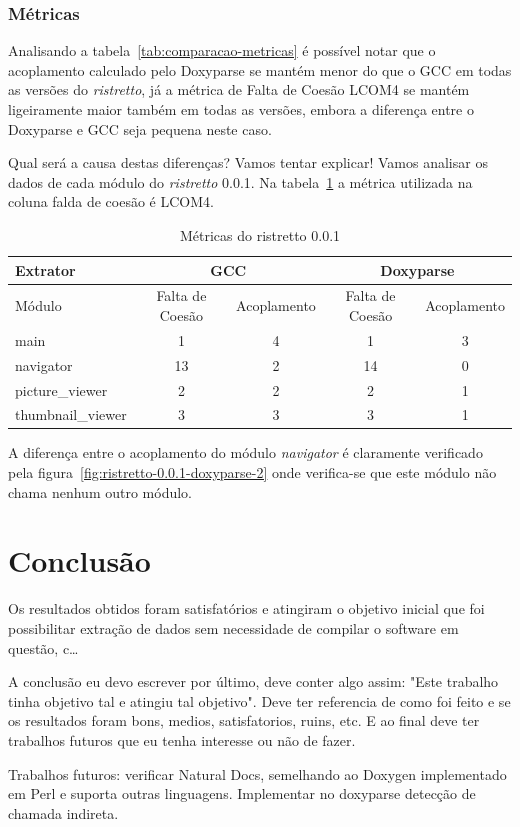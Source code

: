 \subsection{Métricas}

Analisando a tabela~\ref{tab:comparacao-metricas}  é possível notar que o acoplamento calculado pelo Doxyparse
se mantém menor do que o GCC em todas as versões do {\it ristretto}, já a métrica de
Falta de Coesão LCOM4 se mantém ligeiramente maior também em todas as versões,
embora a diferença entre o Doxyparse e GCC seja pequena neste caso.

Qual será a causa destas diferenças? Vamos tentar explicar! Vamos analisar os
dados de cada módulo do {\it ristretto} 0.0.1. Na
tabela~\ref{tab:comparacao-metricas-ristretto-0.0.1} a métrica utilizada na
coluna falda de coesão é LCOM4.

\begin{table}
\caption{Métricas do ristretto 0.0.1}
\centering
\begin{tabular}{| l | c c | c c |}
\hline
Extrator          & \multicolumn{2}{|c|}{GCC}        & \multicolumn{2}{|c|}{Doxyparse} \\
\hline
Módulo            & Falta de Coesão & Acoplamento    & Falta de Coesão & Acoplamento   \\
\hline
main              & 1               & 4              & 1               & 3             \\
navigator         & 13              & 2              & 14              & 0             \\
picture\_viewer   & 2               & 2              & 2               & 1             \\
thumbnail\_viewer & 3               & 3              & 3               & 1             \\
\hline
\end{tabular}
\label{tab:comparacao-metricas-ristretto-0.0.1}
\end{table}

A diferença entre o acoplamento do módulo {\it navigator} é claramente
verificado pela figura~\ref{fig:ristretto-0.0.1-doxyparse-2} onde verifica-se que
este módulo não chama nenhum outro módulo.

\chapter{Conclusão} \label{ch:conclusao}

Os resultados obtidos foram satisfatórios e atingiram o objetivo inicial que
foi possibilitar extração de dados sem necessidade de compilar o software em
questão, c\ldots

A conclusão eu devo escrever por último, deve conter algo assim: "Este trabalho
tinha objetivo tal e atingiu tal objetivo". Deve ter referencia de como foi
feito e se os resultados foram bons, medios, satisfatorios, ruins, etc. E ao
final deve ter trabalhos futuros que eu tenha interesse ou não de fazer.

Trabalhos futuros: verificar Natural Docs, semelhando ao Doxygen implementado
em Perl e suporta outras linguagens. Implementar no doxyparse detecção de chamada
indireta.
